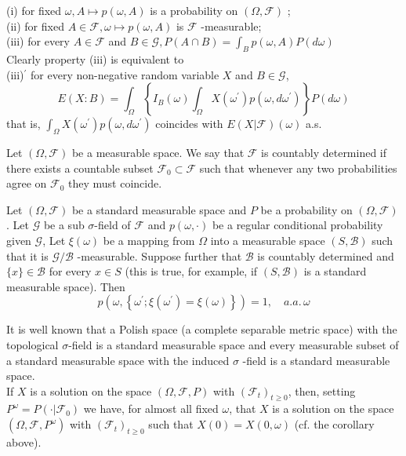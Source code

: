 \begin{itemize}
\begin{definition}
 (i) for fixed $\omega, A \longmapsto p(\omega, A)$  is a probability on $(\Omega, \mathscr{F})$ ; \\
(ii) for fixed $A \in \mathscr{F}, \omega \longmapsto p(\omega, A)$ is $\mathscr{F}$ -measurable; \\
(iii) for every $A \in \mathscr{F}$ and $B \in \mathscr{G}$$,P(A \cap B)=\int_{B} p(\omega, A) P(d \omega)$ \\
Clearly property (iii) is equivalent to \\
(iii)$^\prime$ for every non-negative random variable $X$ and $B \in \mathscr{G}$,
\[ E(X: B)=\int_{\Omega}\left\{I_{B}(\omega) \int_{\Omega} X\left(\omega^{\prime}\right) p\left(\omega, d \omega^{\prime}\right)\right\} P(d \omega) \]
 that is, $\int_{\Omega} X\left(\omega^{\prime}\right) p\left(\omega, d \omega^{\prime}\right)$ coincides with $E(X | \mathscr{F})(\omega)$ a.s.
\end{definition}
\begin{definition}
	Let $(\Omega, \mathscr{F})$ be a measurable space. We say that $\mathscr{F}$ is countably determined if there exists a countable subset $\mathscr{F}_{0} \subset \mathscr{F}$ such that whenever any two probabilities agree on $  \mathscr{F}_{0} $ they must coincide.
\end{definition}
\begin{corollary}
	Let $ ( \Omega, \mathscr{F})$ be a standard measurable space and $P$ be a probability on  $(\Omega, \mathscr{F})$. Let $\mathscr{G}$ be a sub $\sigma$-field of $\mathscr{F}$ and $p(\omega, \cdot)$ be a regular conditional probability given $\mathscr{G}$,  Let $\xi(\omega)$ be a mapping from $\Omega$
	into a measurable space $(S, \mathscr{B})$ such that it is $\mathscr{G} / \mathscr{B}$ -measurable. Suppose further that $\mathscr{B}$ is countably determined and $\{x\} \in \mathscr{B}$ for every $x \in S$ (this is true, for example, if $(S, \mathscr{B})$ is a standard measurable space). Then 
	\[ p\left(\omega,\left\{\omega^{\prime} ; \xi\left(\omega^{\prime}\right)=\xi(\omega)\right\}\right)=1, \quad a.a.\, \omega \]
\end{corollary}
\begin{remark}
	It is well known that a Polish space (a complete separable metric space) with the topological $\sigma$-field is a standard measurable space and every measurable subset of a standard measurable space with the induced $\sigma$ -field is a standard measurable space.\\
	If $ X $ is a solution on the space $(\Omega, \mathscr{F}, P)$ with $\left(\mathscr{F}_{t}\right)_{t \ge 0}$, then, setting $P^{\omega}=P\left(\cdot | \mathscr{F}_{0}\right)$ we have, for almost all fixed $\omega$, that $X$ is a solution on the space $\left(\Omega, \mathscr{F}, P^{\omega}\right)$ with $\left(\mathscr{F}_{t}\right)_{t \ge 0}$ such that $X(0)=X(0, \omega)$ (cf. the corollary above).
\end{remark}
\end{itemize}
